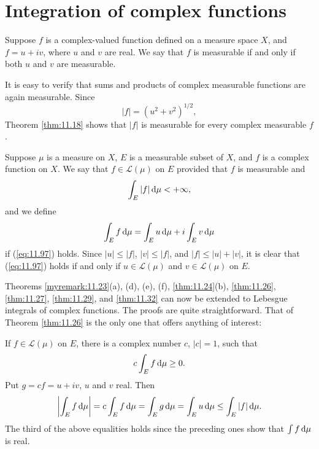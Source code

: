 
\section{Integration of complex functions}

Suppose $f$ is a complex-valued function defined on a measure space $X$, 
and $f = u + iv$, 
where $u$ and $v$ are real. 
We say that $f$ is measurable if and only if
both $u$ and $v$ are measurable.

It is easy to verify that sums and products of complex measurable functions
are again measurable. Since
\begin{equation*}
    \left| f \right| = (u^2 + v^2)^{1/2},
\end{equation*}
Theorem \ref{thm:11.18} shows that $|f|$ is measurable for every complex measurable $f$.

Suppose $\mu$ is a measure on $X$, 
$E$ is a measurable subset of $X$, 
and $f$ is a complex function on $X$. 
We say that $f \in \mathscr{L}(\mu)$ on $E$ provided that $f$ is measurable
and 
\begin{equation}
    \label{eq:11.97}
    \int_E \left| f \right| \d \mu < +\infty ,
\end{equation}
and we define 
\begin{equation*}
    \int_E f \d \mu =
    \int_E u \d \mu + i
    \int_E v \d \mu
\end{equation*}
if (\ref{eq:11.97}) holds. 
Since $|u| \leq |f|$, $|v| \leq |f|$, and $|f | \leq | u | + | v |$, 
it is clear that
(\ref{eq:11.97}) holds if and only if $u \in \mathscr{L}(\mu)$ and $v \in \mathscr{L}(\mu)$ on $E$.

Theorems \ref{myremark:11.23}(a), (d), (e), (f), \ref{thm:11.24}(b), \ref{thm:11.26}, \ref{thm:11.27}, \ref{thm:11.29}, and \ref{thm:11.32}
can now be extended to Lebesgue integrals of complex functions. 
The proofs are quite straightforward. 
That of Theorem \ref{thm:11.26} is the only one that offers
anything of interest:

If $f \in \mathscr{L}(\mu)$ on $E$, there is a complex number $c$, $|c| = 1$, such that 
\begin{equation*}
    c \int_E f \d \mu \geq 0 .
\end{equation*}
Put $g = cf = u + iv$, $u$ and $v$ real.
Then 
\begin{equation*}
    \left| \int_E f \d \mu \right| = 
    c \int_E f \d \mu =
    \int_E g \d \mu =
    \int_E u \d \mu \leq 
    \int_E | f | \d \mu .
\end{equation*}
The third of the above equalities holds since the preceding ones show that
$\int f \d \mu$ is real.
